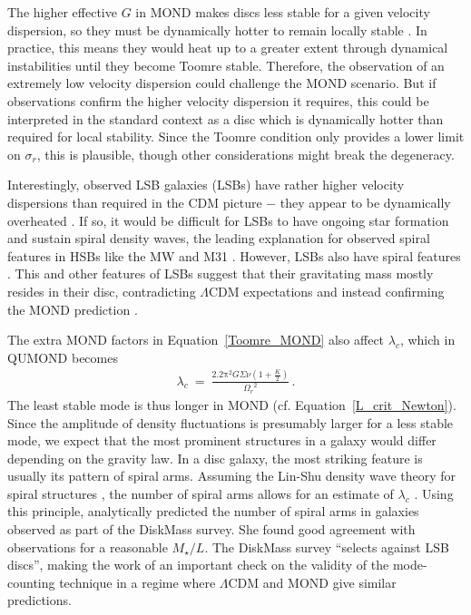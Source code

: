 \documentclass[fleqn,usenatbib,useAMS]{mnras} %
\begin{document}
The higher effective $G$ in MOND makes discs less stable for a given velocity dispersion, so they must be dynamically hotter to remain locally stable \citep{McGaugh_1998}. In practice, this means they would heat up to a greater extent through dynamical instabilities until they become Toomre stable. Therefore, the observation of an extremely low velocity dispersion could challenge the MOND scenario. But if observations confirm the higher velocity dispersion it requires, this could be interpreted in the standard context as a disc which is dynamically hotter than required for local stability. Since the Toomre condition only provides a lower limit on $\sigma_r$, this is plausible, though other considerations might break the degeneracy.

Interestingly, observed LSB galaxies (LSBs) have rather higher velocity dispersions than required in the CDM picture $-$ they appear to be dynamically overheated \citep{Saburova_2011}. If so, it would be difficult for LSBs to have ongoing star formation and sustain spiral density waves, the leading explanation for observed spiral features in HSBs like the MW and M31 \citep{Lin_1964}. However, LSBs also have spiral features \citep{Schombert_1992, Blok_1995, McGaugh_1995_image, Impey_1996}. This and other features of LSBs suggest that their gravitating mass mostly resides in their disc, contradicting $\Lambda$CDM expectations and instead confirming the MOND prediction \citep[section~3.3 of][]{McGaugh_1998}.

The extra MOND factors in Equation~\ref{Toomre_MOND} also affect $\lambda_c$, which in QUMOND becomes
\begin{eqnarray}
	\lambda_c ~=~ \frac{2.2 \mathrm{\pi}^2 G \Sigma \nu \left( 1 + \frac{K}{2} \right)}{{\Omega_r}^2} \, .
	\label{L_crit_MOND}
\end{eqnarray}
The least stable mode is thus longer in MOND (cf. Equation~\ref{L_crit_Newton}). Since the amplitude of density fluctuations is presumably larger for a less stable mode, we expect that the most prominent structures in a galaxy would differ depending on the gravity law. In a disc galaxy, the most striking feature is usually its pattern of spiral arms. Assuming the Lin-Shu density wave theory for spiral structures \citep{Lin_1964}, the number of spiral arms allows for an estimate of $\lambda_c$ \citep{Sellwood_1984, Athanassoula_1987}. Using this principle, \citet{Elena_2015} analytically predicted the number of spiral arms in galaxies observed as part of the DiskMass survey. She found good agreement with observations for a reasonable $M_{\star}/L$. The DiskMass survey ``selects against LSB discs'', making the work of \citet{Elena_2015} an important check on the validity of the mode-counting technique in a regime where $\Lambda$CDM and MOND give similar predictions.
\end{document}
